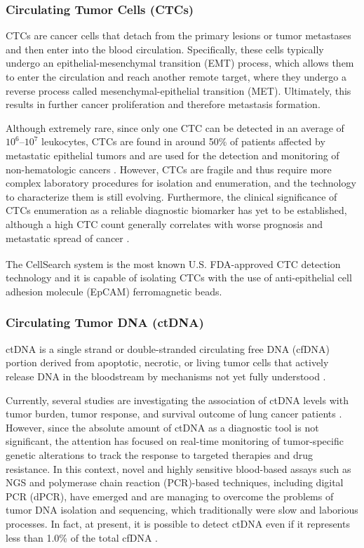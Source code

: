 \subsubsection{Circulating Tumor Cells (CTCs)}

CTCs are cancer cells that detach from the primary lesions or tumor metastases and then enter into the blood circulation. Specifically, these cells typically undergo an epithelial-mesenchymal transition (EMT) process, which allows them to enter the circulation and reach another remote target, where they undergo a reverse process called mesenchymal-epithelial transition (MET). Ultimately, this results in further cancer proliferation and therefore metastasis formation.

Although extremely rare, since only one CTC can be detected in an average of $10^6$–$10^7$ leukocytes, CTCs are found in around 50\% of patients affected by metastatic epithelial tumors and are used for the detection and monitoring of non-hematologic cancers \cite{CTC_prognosis, CTC_blood}. However, CTCs are fragile and thus require more complex laboratory procedures for isolation and enumeration, and the technology to characterize them is still evolving. Furthermore, the clinical significance of CTCs enumeration as a reliable diagnostic biomarker has yet to be established, although a high CTC count generally correlates with worse prognosis and metastatic spread of cancer \cite{CTC_prognosis}.

The CellSearch\textsuperscript\textregistered{} system is the most known U.S. FDA-approved CTC detection technology and it is capable of isolating CTCs with the use of anti-epithelial cell adhesion molecule (EpCAM) ferromagnetic beads.

\subsubsection{Circulating Tumor DNA (ctDNA)}

ctDNA is a single strand or double-stranded circulating free DNA (cfDNA) portion derived from apoptotic, necrotic, or living tumor cells that actively release DNA in the bloodstream by mechanisms not yet fully understood \cite{ctDNA}. 

Currently, several studies are investigating the association of ctDNA levels with tumor burden, tumor response, and survival outcome of lung cancer patients \cite{ctDNA, ctDNA_NSCLC}. However, since the absolute amount of ctDNA as a diagnostic tool is not significant, the attention has focused on real-time monitoring of tumor-specific genetic alterations to track the response to targeted therapies and drug resistance. In this context, novel and highly sensitive blood-based assays such as NGS and polymerase chain reaction (PCR)-based techniques, including digital PCR (dPCR), have emerged and are managing to overcome the problems of tumor DNA isolation and sequencing, which traditionally were slow and laborious processes. In fact, at present, it is possible to detect ctDNA even if it represents less than 1.0\% of the total cfDNA \cite{ctDNA_NSCLC, ctDNA_LB}.

